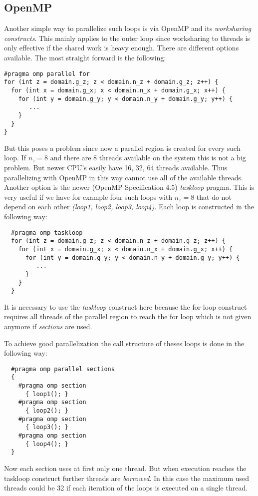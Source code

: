 \documentclass[master.tex]{subfiles}
\begin{document}
\subsection{OpenMP} \label{sec:open-mp-method}
Another simple way to parallelize such loops is via OpenMP and its \textit{worksharing constructs}. This mainly applies to the outer loop since worksharing to threads is only effective if the shared work is heavy enough. There are different options available. The most straight forward is the following:
\begin{lstlisting}
#pragma omp parallel for
for (int z = domain.g_z; z < domain.n_z + domain.g_z; z++) {
  for (int x = domain.g_x; x < domain.n_x + domain.g_x; x++) {
    for (int y = domain.g_y; y < domain.n_y + domain.g_y; y++) {
       ...
    }
  }
}
\end{lstlisting}
But this poses a problem since now a parallel region is created for every such loop. If $n_z=8$ and there are 8 threads available on the system this is not a big problem. But newer CPU's easily have 16, 32, 64 threads available. Thus parallelizing with OpenMP in this way cannot use all of the available threads. Another option is the newer (OpenMP Specification 4.5) \textit{taskloop} pragma. This is very useful if we have for example four such loops with $n_z=8$ that do not depend on each other \textit{(loop1, loop2, loop3, loop4)}. Each loop is constructed in the following way:
\begin{lstlisting}
  #pragma omp taskloop
  for (int z = domain.g_z; z < domain.n_z + domain.g_z; z++) {
    for (int x = domain.g_x; x < domain.n_x + domain.g_x; x++) {
      for (int y = domain.g_y; y < domain.n_y + domain.g_y; y++) {
         ...
      }
    }
  }
\end{lstlisting}
\begin{blockquote}
  \small
  It is necessary to use the \textit{taskloop} construct here because the for loop construct requires all threads of the parallel region to reach the for loop which is not given anymore if \textit{sections} are used.
\end{blockquote}

To achieve good parallelization the call structure of theses loops is done in the following way:
\begin{lstlisting}
  #pragma omp parallel sections
  {
    #pragma omp section 
      { loop1(); }
    #pragma omp section
      { loop2(); }
    #pragma omp section
      { loop3(); }
    #pragma omp section
      { loop4(); }
  }
\end{lstlisting}
Now each section uses at first only one thread. But when execution reaches the taskloop construct further threads are \textit{borrowed}. In this case the maximum used threads could be 32 if each iteration of the loops is executed on a single thread.\newline
\end{document}
